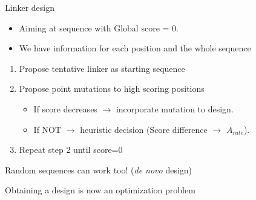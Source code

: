 \documentclass{beamer}
\begin{document}
\begin{frame}{Linker design}
\begin{itemize}
 \item Aiming at sequence with Global score = 0.
  
 \item We have information for each position and the whole sequence
 
\end{itemize}


\begin{enumerate}
 \item Propose tentative linker as starting sequence 
   
 \item Propose point mutations to high scoring positions
      \begin{itemize}
      \item If score decreases $\rightarrow$ incorporate mutation to design.  
      \item If NOT $\rightarrow$ heuristic decision (Score difference $\rightarrow$  $A_{rate}$).  
     \end{itemize}
      
 \item Repeat step 2 until score=0
\end{enumerate}

 
\Large{Random sequences can work too! (\textit{de novo} design)}\\
\vspace{7px}
 
\Large{Obtaining a design is now an optimization problem}




\end{frame}
\end{document}

